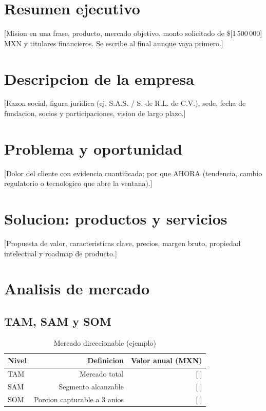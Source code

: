 \documentclass[12pt]{article}
\newcommand{\MontoSolicitado}{[1\,500\,000]}
\newcommand{\Moneda}{MXN}
\begin{document}

\tableofcontents
\newpage

\section{Resumen ejecutivo}
[Mision en una frase, producto, mercado objetivo, monto solicitado de
\$\MontoSolicitado{} \Moneda{} y titulares financieros. Se escribe al
final aunque vaya primero.]

\section{Descripcion de la empresa}
[Razon social, figura juridica (ej. S.A.S. / S. de R.L. de C.V.), sede,
fecha de fundacion, socios y participaciones, vision de largo plazo.]

\section{Problema y oportunidad}
[Dolor del cliente con evidencia cuantificada; por que AHORA (tendencia,
cambio regulatorio o tecnologico que abre la ventana).]

\section{Solucion: productos y servicios}
[Propuesta de valor, caracteristicas clave, precios, margen bruto,
propiedad intelectual y roadmap de producto.]

\section{Analisis de mercado}
\subsection{TAM, SAM y SOM}
\begin{table}[h]
  \centering
  \caption{Mercado direccionable (ejemplo)}
  \begin{tabular}{lrr}
    \toprule
    Nivel & Definicion & Valor anual (\Moneda{}) \\
    \midrule
    TAM & Mercado total & [ ] \\
    SAM & Segmento alcanzable & [ ] \\
    SOM & Porcion capturable a 3 anios & [ ] \\
    \bottomrule
  \end{tabular}
\end{table}
\end{document}

